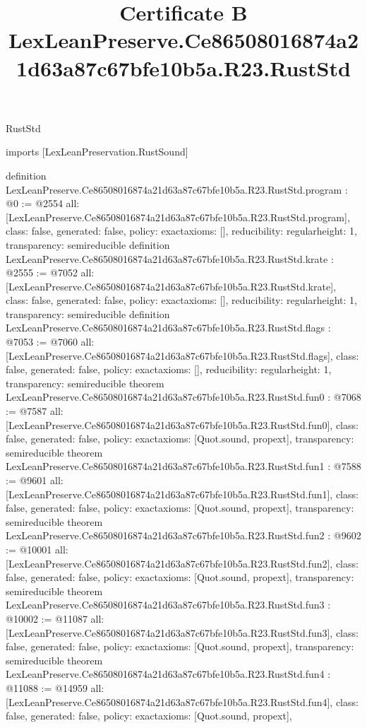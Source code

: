 \begin{lexlean}{RustStd}
\title{Certificate B LexLeanPreserve.Ce86508016874a21d63a87c67bfe10b5a.R23.RustStd}
\begin{coremodule}
imports [LexLeanPreservation.RustSound]

definition LexLeanPreserve.Ce86508016874a21d63a87c67bfe10b5a.R23.RustStd.program : @0 := @2554 {
  all: [LexLeanPreserve.Ce86508016874a21d63a87c67bfe10b5a.R23.RustStd.program],
  class: false,
  generated: false,
  policy: exact{axioms: []},
  reducibility: regular{height: 1},
  transparency: semireducible
}
definition LexLeanPreserve.Ce86508016874a21d63a87c67bfe10b5a.R23.RustStd.krate : @2555 := @7052 {
  all: [LexLeanPreserve.Ce86508016874a21d63a87c67bfe10b5a.R23.RustStd.krate],
  class: false,
  generated: false,
  policy: exact{axioms: []},
  reducibility: regular{height: 1},
  transparency: semireducible
}
definition LexLeanPreserve.Ce86508016874a21d63a87c67bfe10b5a.R23.RustStd.flags : @7053 := @7060 {
  all: [LexLeanPreserve.Ce86508016874a21d63a87c67bfe10b5a.R23.RustStd.flags],
  class: false,
  generated: false,
  policy: exact{axioms: []},
  reducibility: regular{height: 1},
  transparency: semireducible
}
theorem LexLeanPreserve.Ce86508016874a21d63a87c67bfe10b5a.R23.RustStd.fun0 : @7068 := @7587 {
  all: [LexLeanPreserve.Ce86508016874a21d63a87c67bfe10b5a.R23.RustStd.fun0],
  class: false,
  generated: false,
  policy: exact{axioms: [Quot.sound, propext]},
  transparency: semireducible
}
theorem LexLeanPreserve.Ce86508016874a21d63a87c67bfe10b5a.R23.RustStd.fun1 : @7588 := @9601 {
  all: [LexLeanPreserve.Ce86508016874a21d63a87c67bfe10b5a.R23.RustStd.fun1],
  class: false,
  generated: false,
  policy: exact{axioms: [Quot.sound, propext]},
  transparency: semireducible
}
theorem LexLeanPreserve.Ce86508016874a21d63a87c67bfe10b5a.R23.RustStd.fun2 : @9602 := @10001 {
  all: [LexLeanPreserve.Ce86508016874a21d63a87c67bfe10b5a.R23.RustStd.fun2],
  class: false,
  generated: false,
  policy: exact{axioms: [Quot.sound, propext]},
  transparency: semireducible
}
theorem LexLeanPreserve.Ce86508016874a21d63a87c67bfe10b5a.R23.RustStd.fun3 : @10002 := @11087 {
  all: [LexLeanPreserve.Ce86508016874a21d63a87c67bfe10b5a.R23.RustStd.fun3],
  class: false,
  generated: false,
  policy: exact{axioms: [Quot.sound, propext]},
  transparency: semireducible
}
theorem LexLeanPreserve.Ce86508016874a21d63a87c67bfe10b5a.R23.RustStd.fun4 : @11088 := @14959 {
  all: [LexLeanPreserve.Ce86508016874a21d63a87c67bfe10b5a.R23.RustStd.fun4],
  class: false,
  generated: false,
  policy: exact{axioms: [Quot.sound, propext]},
}
\end{coremodule}
\end{lexlean}
